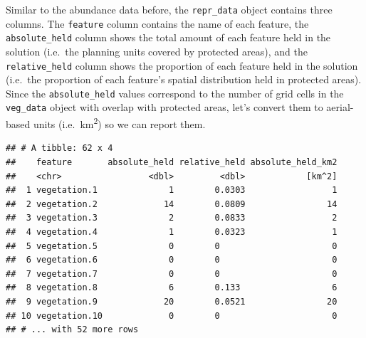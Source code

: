 \documentclass[12pt,]{book}
\newenvironment{Shaded}{\begin{snugshade}}{\end{snugshade}}
\newcommand{\KeywordTok}[1]{\textcolor[rgb]{0.13,0.29,0.53}{\textbf{#1}}}
\newcommand{\DecValTok}[1]{\textcolor[rgb]{0.00,0.00,0.81}{#1}}
\newcommand{\StringTok}[1]{\textcolor[rgb]{0.31,0.60,0.02}{#1}}
\newcommand{\CommentTok}[1]{\textcolor[rgb]{0.56,0.35,0.01}{\textit{#1}}}
\newcommand{\OperatorTok}[1]{\textcolor[rgb]{0.81,0.36,0.00}{\textbf{#1}}}
\newcommand{\NormalTok}[1]{#1}
\begin{document}
Similar to the abundance data before, the \texttt{repr\_data} object
contains three columns. The \texttt{feature} column contains the name of
each feature, the \texttt{absolute\_held} column shows the total amount
of each feature held in the solution (i.e.~the planning units covered by
protected areas), and the \texttt{relative\_held} column shows the
proportion of each feature held in the solution (i.e.~the proportion of
each feature's spatial distribution held in protected areas). Since the
\texttt{absolute\_held} values correspond to the number of grid cells in
the \texttt{veg\_data} object with overlap with protected areas, let's
convert them to aerial-based units (i.e.~km\textsuperscript{2}) so we
can report them.

\begin{Shaded}
\end{Shaded}

\begin{verbatim}
## # A tibble: 62 x 4
##    feature       absolute_held relative_held absolute_held_km2
##    <chr>                 <dbl>         <dbl>            [km^2]
##  1 vegetation.1              1        0.0303                 1
##  2 vegetation.2             14        0.0809                14
##  3 vegetation.3              2        0.0833                 2
##  4 vegetation.4              1        0.0323                 1
##  5 vegetation.5              0        0                      0
##  6 vegetation.6              0        0                      0
##  7 vegetation.7              0        0                      0
##  8 vegetation.8              6        0.133                  6
##  9 vegetation.9             20        0.0521                20
## 10 vegetation.10             0        0                      0
## # ... with 52 more rows
\end{verbatim}
\end{document}
